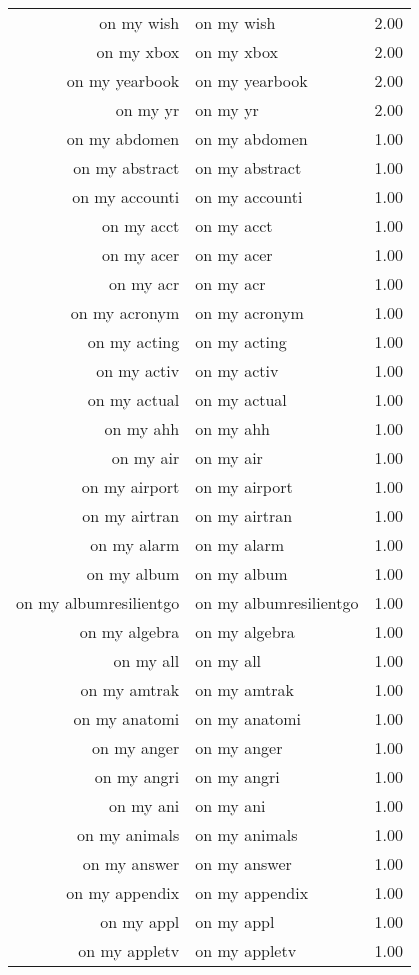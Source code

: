 \begin{table}[ht]
\begin{tabular}{rlr}
  on my wish & on my wish & 2.00 \\ 
  on my xbox & on my xbox & 2.00 \\ 
  on my yearbook & on my yearbook & 2.00 \\ 
  on my yr & on my yr & 2.00 \\ 
  on my abdomen & on my abdomen & 1.00 \\ 
  on my abstract & on my abstract & 1.00 \\ 
  on my accounti & on my accounti & 1.00 \\ 
  on my acct & on my acct & 1.00 \\ 
  on my acer & on my acer & 1.00 \\ 
  on my acr & on my acr & 1.00 \\ 
  on my acronym & on my acronym & 1.00 \\ 
  on my acting & on my acting & 1.00 \\ 
  on my activ & on my activ & 1.00 \\ 
  on my actual & on my actual & 1.00 \\ 
  on my ahh & on my ahh & 1.00 \\ 
  on my air & on my air & 1.00 \\ 
  on my airport & on my airport & 1.00 \\ 
  on my airtran & on my airtran & 1.00 \\ 
  on my alarm & on my alarm & 1.00 \\ 
  on my album & on my album & 1.00 \\ 
  on my albumresilientgo & on my albumresilientgo & 1.00 \\ 
  on my algebra & on my algebra & 1.00 \\ 
  on my all & on my all & 1.00 \\ 
  on my amtrak & on my amtrak & 1.00 \\ 
  on my anatomi & on my anatomi & 1.00 \\ 
  on my anger & on my anger & 1.00 \\ 
  on my angri & on my angri & 1.00 \\ 
  on my ani & on my ani & 1.00 \\ 
  on my animals & on my animals & 1.00 \\ 
  on my answer & on my answer & 1.00 \\ 
  on my appendix & on my appendix & 1.00 \\ 
  on my appl & on my appl & 1.00 \\ 
  on my appletv & on my appletv & 1.00 \\ 

\end{tabular}
\end{table}
